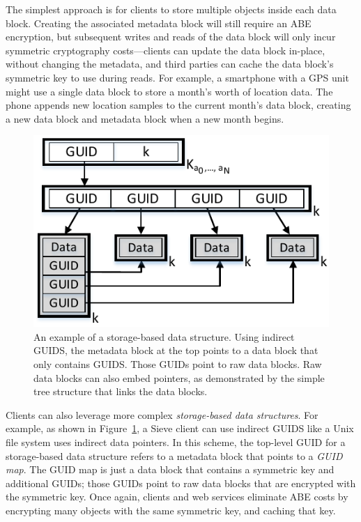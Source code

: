 The simplest approach is for clients to
store multiple objects inside each data block.
Creating the associated metadata block
will still require an ABE encryption,
but subsequent writes and reads of the data
block will only incur symmetric cryptography
costs---clients can update the data block
in-place, without changing the metadata,
and third parties can cache the data block's
symmetric key to use during reads. For
example, a smartphone with a GPS unit might
use a single data block to store a month's
worth of location data. The phone appends
new location samples to the current month's
data block, creating a new data block and
metadata block when a new month begins.

\begin{figure}
  \centering
     \includegraphics{figs/guidMap2.pdf}
     \caption{An example of a storage-based data structure. 
              Using indirect GUIDS, the metadata block at the top
              points to a data block that only contains GUIDS.
              Those GUIDs point to raw data blocks. Raw data blocks
              can also embed pointers, as demonstrated by the simple
              tree structure that links the data blocks.}
  \label{fig:guidMap}
\end{figure}

Clients can also leverage more complex \emph{storage-based
data structures}. For example, as shown in
Figure~\ref{fig:guidMap}, a Sieve client can
use indirect GUIDS like a Unix file system uses
indirect data pointers. In this scheme, the
top-level GUID for a storage-based data
structure refers to a metadata block that
points to a \emph{GUID map}. The GUID map
is just a data block that contains a symmetric
key and additional GUIDs; those GUIDs point to
raw data blocks that are encrypted with the
symmetric key. Once again, clients and web
services eliminate ABE costs by encrypting
many objects with the same symmetric key,
and caching that key.

